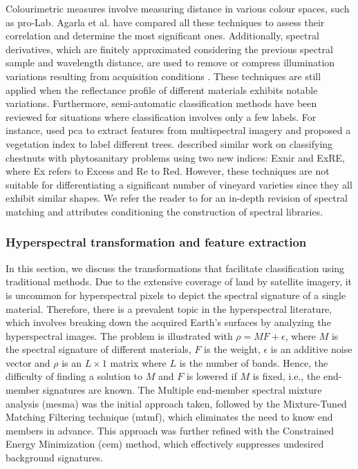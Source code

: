 Colourimetric measures involve measuring distance in various colour spaces, such as pro-Lab. Agarla et al. \cite{agarla_analysis_2021} have compared all these techniques to assess their correlation and determine the most significant ones. Additionally, spectral derivatives, which are finitely approximated considering the previous spectral sample and wavelength distance, are used to remove or compress illumination variations resulting from acquisition conditions \cite{fernandes_grapevine_2019, pu_hyperspectral_2017}. These techniques are still applied when the reflectance profile of different materials exhibits notable variations. Furthermore, semi-automatic classification methods have been reviewed for situations where classification involves only a few labels. For instance, \cite{ahmed_applied_2021} used \acrshort{pca} to extract features from multispectral imagery and proposed a vegetation index to label different trees. \cite{padua_monitoring_2020} described similar work on classifying chestnuts with phytosanitary problems using two new indices: Ex\acrshort{nir} and ExRE, where Ex refers to Excess and Re to Red. However, these techniques are not suitable for differentiating a significant number of vineyard varieties since they all exhibit similar shapes. We refer the reader to \cite{shanmugam_spectral_2014} for an in-depth revision of spectral matching and attributes conditioning the construction of spectral libraries.

\subsubsection{Hyperspectral transformation and feature extraction}

In this section, we discuss the transformations that facilitate classification using traditional methods. Due to the extensive coverage of land by satellite imagery, it is uncommon for hyperspectral pixels to depict the spectral signature of a single material. Therefore, there is a prevalent topic in the hyperspectral literature, which involves breaking down the acquired Earth's surfaces by analyzing the hyperspectral images. The problem is illustrated with $\rho = \textit{MF} + \epsilon$, where $M$ is the spectral signature of different materials, $F$ is the weight, $\epsilon$ is an additive noise vector and $\rho$ is an $L \times 1$ matrix where $L$ is the number of bands. Hence, the difficulty of finding a solution to $M$ and $F$ is lowered if $M$ is fixed, i.e., the end-member signatures are known. The Multiple end-member spectral mixture analysis (\acrshort{mesma}) was the initial approach taken,
followed by the Mixture-Tuned Matching Filtering technique (\acrshort{mtmf}), which eliminates the need to know end members in advance. This approach was further refined with the Constrained Energy Minimization (\acrshort{cem}) method, which effectively suppresses undesired background signatures.

